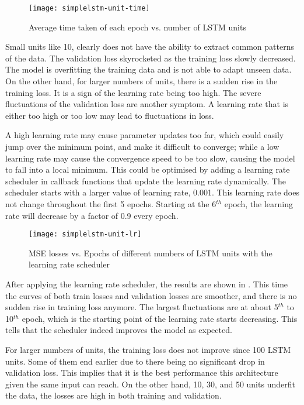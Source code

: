 \begin{figure}[!htb]
    \centering
    \texttt{[image: simplelstm-unit-time]}
    \caption{Average time taken of each epoch vs. number of LSTM units}
    \label{Figure:simplelstm-unit-time}
\end{figure}

Small units like 10, clearly does not have the ability to extract common patterns of the data. The validation loss skyrocketed as the training loss slowly decreased.
The model is overfitting the training data and is not able to adapt unseen data. On the other hand, for larger numbers of units, there is a sudden rise in the training loss. 
It is a sign of the learning rate being too high. The severe fluctuations of the validation loss are another symptom.
A learning rate that is either too high or too low may lead to fluctuations in loss. 

A high learning rate may cause parameter updates too far, which could easily jump over the minimum point, and make it difficult to converge; 
while a low learning rate may cause the convergence speed to be too slow, causing the model to fall into a local minimum. 
This could be optimised by adding a learning rate scheduler in callback functions that update the learning rate dynamically.
The scheduler starts with a larger value of learning rate, 0.001. This learning rate does not change throughout the first 5 epochs.
Starting at the 6$^{th}$ epoch, the learning rate will decrease by a factor of 0.9 every epoch.

\begin{figure}[!htb]
    \centering
    \texttt{[image: simplelstm-unit-lr]}
    \caption{MSE losses vs. Epochs of different numbers of LSTM units with the learning rate scheduler}
    \label{Figure:simplelstm-unit-lr}
\end{figure}

After applying the learning rate scheduler, the results are shown in . 
This time the curves of both train losses and validation losses are smoother, and there is no sudden rise in training loss anymore. The largest fluctuations are at about 5$^{th}$ to 10$^{th}$ epoch, which is the starting point of the learning rate starts decreasing. 
This tells that the scheduler indeed improves the model as expected. 

For larger numbers of units, the training loss does not improve since 100 LSTM units. Some of them end earlier due to there being no significant drop in validation loss. 
This implies that it is the best performance this architecture given the same input can reach. 
On the other hand, 10, 30, and 50 units underfit the data, the losses are high in both training and validation. 

